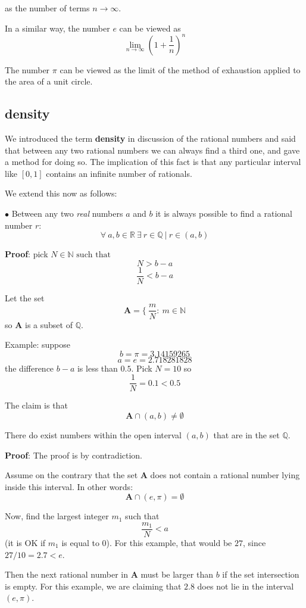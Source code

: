 \documentclass[11pt, oneside]{article}
\begin{document}
as the number of terms $n \rightarrow \infty$.

In a similar way, the number $e$ can be viewed as
\[ \lim_{n \rightarrow \infty} (1 + \frac{1}{n})^n \]

The number $\pi$ can be viewed as the limit of the method of exhaustion applied to the area of a unit circle.

\subsection*{density}
We introduced the term \textbf{density} in discussion of the rational numbers and said that between any two rational numbers we can always find a third one, and gave a method for doing so.  The implication of this fact is that any particular interval like $[0,1]$ contains an infinite number of rationals.

We extend this now as follows:

$\bullet$  Between any two \emph{real} numbers $a$ and $b$ it is always possible to find a rational number $r$:  
\[ \forall \ a,b \in \mathbb{R} \ \exists \ r \in \mathbb{Q} \ | \ r \in (a,b) \]

\textbf{Proof}:  pick $N \in \mathbb{N} \text{ such that }$
\[ N > b - a \]
\[ \frac{1}{N} < b - a \]

Let the set 
\[ \mathbf{A} = \{ \ \frac{m}{N}: \ m \in \mathbb{N} \]
so $\mathbf{A}$ is a subset of $\mathbb{Q}$.

Example:  suppose
\[ b = \pi = 3.14159265 \]
\[ a = e = 2.718281828 \]
the difference $b-a$ is less than $0.5$.  Pick $N = 10$ so
\[ \frac{1}{N} = 0.1 < 0.5 \]

The claim is that
\[ \mathbf{A} \cap (a,b) \ne \emptyset \]

There do exist numbers within the open interval $(a,b)$ that are in the set $\mathbb{Q}$.

\textbf{Proof}:  The proof is by contradiction.  

Assume on the contrary that the set $\mathbf{A}$ does not contain a rational number lying inside this interval.  In other words:
\[ \mathbf{A} \cap (e,\pi) = \emptyset \]

Now, find the largest integer $m_1$ such that 
\[ \frac{m_1}{N} < a \]
(it is OK if $m_1$ is equal to $0$).  For this example, that would be $27$, since $27/10 = 2.7 < e$.

Then the next rational number in $\mathbf{A}$ must be larger than $b$ if the set intersection is empty.  For this example, we are claiming that $2.8$ does not lie in the interval $(e, \pi)$.
\end{document}
